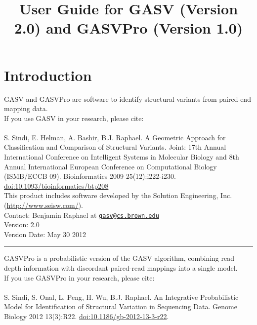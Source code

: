 \documentclass[11pt]{article}
\title{User Guide for GASV (Version 2.0) and GASVPro (Version 1.0)}
\date{}                                           %
\newcommand{\sectionline}{
  \nointerlineskip \vspace{\baselineskip}
  \hspace{\fill}\rule{0.3\linewidth}{.7pt}\hspace{\fill}
  \par\nointerlineskip \vspace{\baselineskip}
}
\begin{document}

\maketitle

\tableofcontents
\clearpage

\section{Introduction}

GASV and GASVPro are software to identify structural variants from paired-end mapping data. \\

\noindent If you use GASV in your research, please cite: \\ \\
S. Sindi, E. Helman, A. Bashir, B.J. Raphael. A Geometric Approach for
Classification and Comparison of Structural Variants. Joint: 17th
Annual International Conference on Intelligent Systems in Molecular
Biology and 8th Annual International European Conference on
Computational Biology (ISMB/ECCB 09).  Bioinformatics 2009
25(12):i222-i230. \href{http://dx.doi.org/10.1093/bioinformatics/btp208}{doi:10.1093/bioinformatics/btp208}\\

\noindent This product includes software developed by the Solution Engineering,
Inc. (\url{http://www.seisw.com/}).\\

\noindent Contact: Benjamin Raphael at \href{mailto:gasv@cs.brown.edu}{\nolinkurl{gasv@cs.brown.edu}}\\

\noindent Version: 2.0 \\
\noindent Version Date: May 30 2012 

\sectionline

\noindent GASVPro is a probabilistic version of the GASV algorithm, combining read depth information with discordant paired-read mappings into a single model. \\

\noindent If you use GASVPro in your research, please cite: \\ \\ 
S. Sindi, S. Onal, L. Peng, H. Wu, B.J. Raphael. An Integrative Probabilistic Model for Identification of Structural Variation in Sequencing Data. Genome Biology 2012 13(3):R22. \href{http://dx.doi.org/10.1186/gb-2012-13-3-r22}{doi:10.1186/gb-2012-13-3-r22}.\\
\end{document}
